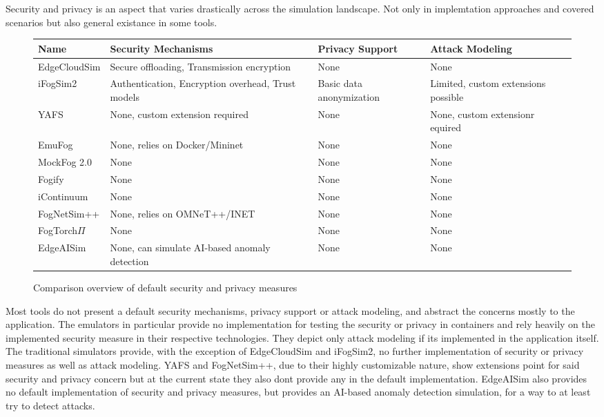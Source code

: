 
Security and privacy is an aspect that varies drastically across the simulation landscape. 
Not only in implemtation approaches and covered scenarios but also general existance in some tools.
\begin{figure}[H]
  \centering
  \begin{tabularx}{\textwidth}{ l | X | X | X }
    \hline
    \textbf{Name} & \textbf{Security Mechanisms} & \textbf{Privacy Support} & \textbf{Attack Modeling}\\
    \hline\hline
    EdgeCloudSim  & Secure offloading, Transmission encryption & None & None \\\hline
    iFogSim2      & Authentication, Encryption overhead, Trust models & Basic data anonymization & Limited, custom extensions possible \\\hline
    YAFS          & None, custom extension required & None & None, custom extensionr equired  \\\hline
    EmuFog        & None, relies on Docker/Mininet & None & None \\\hline
    MockFog 2.0   & None & None & None \\\hline
    Fogify        & None & None & None \\\hline
    iContinuum    & None & None & None \\\hline
    FogNetSim++   & None, relies on OMNeT++/INET & None & None \\\hline
    FogTorch$\Pi$ & None & None & None \\\hline
    EdgeAISim     & None, can simulate AI-based anomaly detection & None & None  \\\hline
  \end{tabularx}
  \caption{Comparison overview of default security and privacy measures}
  \label{tab:analysis-security-n-privacy}
\end{figure}

Most tools do not present a default security mechanisms, privacy support or attack modeling, and abstract the concerns mostly to the application.
The emulators in particular provide no implementation for testing the security or privacy in containers and rely heavily on the implemented security measure in their respective technologies. 
They depict only attack modeling if its implemented in the application itself.
The traditional simulators provide, with the exception of EdgeCloudSim and iFogSim2, no further implementation of security or privacy measures as well as attack modeling.
YAFS and FogNetSim++, due to their highly customizable nature, show extensions point for said security and privacy concern but at the current state they also dont provide any in the default implementation.
EdgeAISim also provides no default implementation of security and privacy measures, but provides an AI-based anomaly detection simulation, for a way to at least try to detect attacks.

